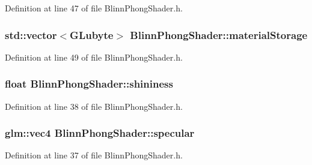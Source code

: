 Definition at line 47 of file Blinn\+Phong\+Shader.\+h.

\hypertarget{class_blinn_phong_shader_a7c9644732d35c788d1c94f44b7783d83}{}
\subsubsection[{material\+Storage}]{\setlength{\rightskip}{0pt plus 5cm}std\+::vector$<$G\+Lubyte$>$ Blinn\+Phong\+Shader\+::material\+Storage\hspace{0.3cm}{\ttfamily [protected]}}\label{class_blinn_phong_shader_a7c9644732d35c788d1c94f44b7783d83}


Definition at line 49 of file Blinn\+Phong\+Shader.\+h.

\hypertarget{class_blinn_phong_shader_ad499c2389d7007ecb4c03d5270314933}{}
\subsubsection[{shininess}]{\setlength{\rightskip}{0pt plus 5cm}float Blinn\+Phong\+Shader\+::shininess\hspace{0.3cm}{\ttfamily [protected]}}\label{class_blinn_phong_shader_ad499c2389d7007ecb4c03d5270314933}


Definition at line 38 of file Blinn\+Phong\+Shader.\+h.

\hypertarget{class_blinn_phong_shader_a7adce7364e850b9f232e058956f809b8}{}
\subsubsection[{specular}]{\setlength{\rightskip}{0pt plus 5cm}glm\+::vec4 Blinn\+Phong\+Shader\+::specular\hspace{0.3cm}{\ttfamily [protected]}}\label{class_blinn_phong_shader_a7adce7364e850b9f232e058956f809b8}


Definition at line 37 of file Blinn\+Phong\+Shader.\+h.

\hypertarget{class_blinn_phong_shader_a7467b1de2650fd04ea63ed5f8aeedc59}{}
